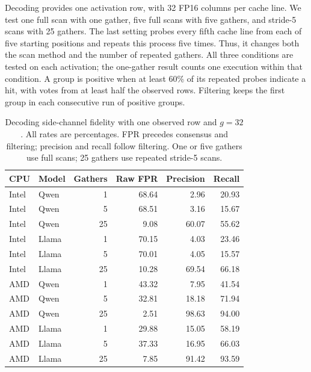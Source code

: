 Decoding provides one activation row, with 32 FP16 columns per cache line.
We test one full scan with one gather, five full scans with five gathers, and stride-5 scans with 25 gathers.
The last setting probes every fifth cache line from each of five starting positions and repeats this process five times.
Thus, it changes both the scan method and the number of repeated gathers.
All three conditions are tested on each activation; the one-gather result counts one execution within that condition.
A group is positive when at least 60\% of its repeated probes indicate a hit, with votes from at least half the observed rows.
Filtering keeps the first group in each consecutive run of positive groups.

\begin{table}[H]
    \centering\footnotesize\setlength{\tabcolsep}{3pt}
    \caption{Decoding side-channel fidelity with one observed row and $g=32$. All rates are percentages. FPR precedes consensus and filtering; precision and recall follow filtering. One or five gathers use full scans; 25 gathers use repeated stride-5 scans.}
    \label{tab:decoding-cache}
    \begin{tabular}{@{}llrrrr@{}}
        \hline
        CPU & Model & Gathers & Raw FPR & Precision & Recall \\\hline
        Intel & Qwen & 1 & 68.64 & 2.96 & 20.93 \\
        Intel & Qwen & 5 & 68.51 & 3.16 & 15.67 \\
        Intel & Qwen & 25 & 9.08 & 60.07 & 55.62 \\
        Intel & Llama & 1 & 70.15 & 4.03 & 23.46 \\
        Intel & Llama & 5 & 70.01 & 4.05 & 15.57 \\
        Intel & Llama & 25 & 10.28 & 69.54 & 66.18 \\
        AMD & Qwen & 1 & 43.32 & 7.95 & 41.54 \\
        AMD & Qwen & 5 & 32.81 & 18.18 & 71.94 \\
        AMD & Qwen & 25 & 2.51 & 98.63 & 94.00 \\
        AMD & Llama & 1 & 29.88 & 15.05 & 58.19 \\
        AMD & Llama & 5 & 37.33 & 16.95 & 66.03 \\
        AMD & Llama & 25 & 7.85 & 91.42 & 93.59 \\
        \hline
    \end{tabular}
\end{table}

